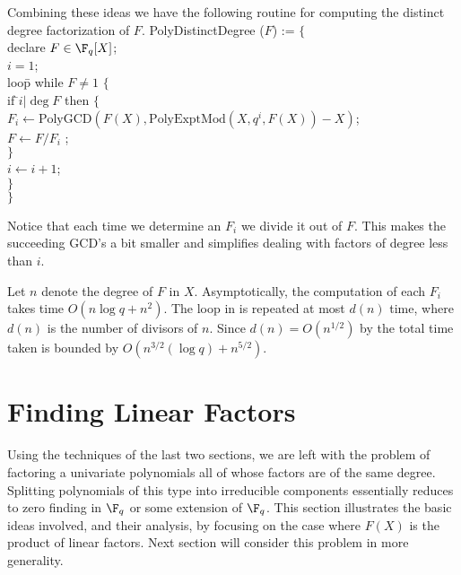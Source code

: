 Combining these ideas we have the following routine for computing the
distinct degree factorization of $F$.
\begindsacode
PolyDistinctDegree ($F$) := $\{$ \\
\> declare $F \in \F_q[X]$; \\
\> $i = 1$; \\
\> loo\=p while $F \not= 1$ $\{$ \\
\>\> if \=$i | \deg F$ then $\{$ \\
\>\>\> $F_i \leftarrow
      \mbox{PolyGCD}(F(X), \mbox{PolyExptMod}(X, q^i, F(X)) - X)$;\\
\>\>\> $F \leftarrow F/F_i$ ; \\
\>\>\> $\}$ \\
\>\> $i \leftarrow i + 1$;\\
\>\> $\}$ \\
\> $\}$
\enddsacode

\noindent
Notice that each time we determine an $F_i$ we divide it out of $F$.
This makes the succeeding GCD's a bit smaller and simplifies dealing
with factors of degree less than $i$.  

Let $n$ denote the degree of $F$ in $X$.  Asymptotically, the
computation of each $F_i$ takes time $O(n \log q + n^2)$.  The loop in
 is repeated at most $d(n)$ time, where
$d(n)$ is the number of divisors of $n$.  Since $d(n) = O(n^{1/2})$ by
 the total time taken is bounded by
$O(n^{3/2}(\log q) + n^{5/2})$.


\section{Finding Linear Factors}
\label{FFac:Linear:Sec}

Using the techniques of the last two sections, we are left with the
problem of factoring a univariate polynomials all of whose factors are
of the same degree.  Splitting polynomials of this type into
irreducible components essentially reduces to zero finding in $\F_q$
or some extension of $\F_q$.  This section illustrates the basic ideas
involved, and their analysis, by focusing on the case where $F(X)$ is
the product of linear factors.  Next section will consider this
problem in more generality.

